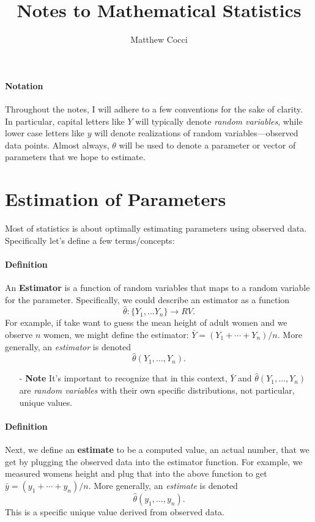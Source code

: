 \documentclass[a4paper,12pt]{scrartcl}
\author{Matthew Cocci}
\title{Notes to Mathematical Statistics}
\date{}
\begin{document}
\maketitle

\tableofcontents
\newpage

\paragraph{Notation} Throughout the notes, I will adhere to a few
conventions for the sake of clarity.  In particular, capital letters
like $Y$ will typically denote \emph{random variables}, while
lower case letters like $y$ will denote realizations of random
variables---observed data points.  Almost always, $\theta$ will be
used to denote a parameter or vector of parameters that we hope to
estimate.


\section{Estimation of Parameters}

Most of statistics is about optimally estimating parameters using
observed data. Specifically let's define a few terms/concepts:
\paragraph{Definition}
      An \textbf{Estimator} is a function of random variables
      that maps to a random variable for the parameter.
      Specifically, we could describe
      an estimator as a function
	 \[ \hat{\theta}: \{Y_1, \ldots Y_n\} \rightarrow RV.\]
      For example, if take want to guess the mean height of adult women
      and we observe $n$ women, we might define the estimator:
	 $\bar{Y} =  (Y_1 + \cdots + Y_n)/n$.
      More generally, an \emph{estimator} is denoted
	 \[ \hat{\theta}(Y_1, \ldots , Y_n).\]
      \begin{itemize}
      \item[-]{
      \textbf{Note} It's important to recognize that in this context,
      $\bar{Y}$ and $\hat{\theta}(Y_1, \ldots , Y_n)$ are
      \emph{random variables} with their own specific distributions,
      not particular, unique values.
      }
      \end{itemize}

\paragraph{Definition}
      Next, we define an \textbf{estimate} to be a computed value,
      an actual number, that we get by plugging the observed data into
      the estimator function.  For example, we measured womens height
      and plug that into the above function to get
	 $\bar{y} =  (y_1 + \cdots + y_n)/n$.
      More generally, an \emph{estimate} is denoted
	 \[ \hat{\theta}(y_1, \ldots , y_n).\]
      This is a specific unique value derived from observed data.
\end{document}
